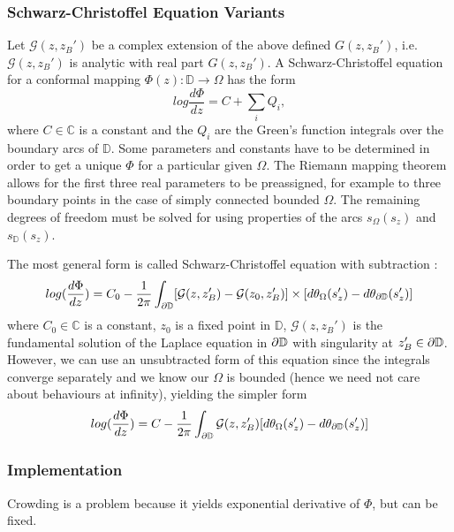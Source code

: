 \subsubsection{Schwarz-Christoffel Equation Variants}
Let $\mathcal{G}(z, z_B')$ be a complex extension of the above defined $G(z,z_B')$, i.e. $\mathcal{G}(z, z_B')$ is analytic with real part $G(z,z_B')$.
A Schwarz-Christoffel equation for a conformal mapping $\Phi(z):\mathbb{D}\to\Omega$ has the form $$ log \frac{d\Phi}{dz}= C+\displaystyle\sum_i Q_i,$$ where $C\in\mathbb{C}$ is a constant and the $Q_i$ are the Green's function integrals over the boundary arcs of $\mathbb{D}$.
Some parameters and constants have to be determined in order to get a unique $\Phi$ for a particular given $\Omega$. The Riemann mapping theorem allows  for the first three real parameters to be preassigned, for example to three boundary points in the case of simply connected bounded $\Omega$. The remaining degrees of freedom must be solved for using properties of the arcs $s_{\Omega}(s_z)$ and $s_{\mathbb{D}}(s_z)$. 

The most general form is called Schwarz-Christoffel equation with subtraction \cite{FLORYAN1987_SC_general}:
$$log(\frac{d\Phi}{dz}) = C_0 - \frac{1}{2\pi}\displaystyle\int_{\partial\mathbb {D}} [\mathcal{G}(z, z_B')-\mathcal{G}(z_0, z_B')] \times [d\theta_{\Omega}(s_z')-d\theta_{\partial\mathbb{D}}(s_z')]$$
where $C_0\in\mathbb{C}$ is a constant, $z_0$ is a fixed point in $\mathbb{D}$, $\mathcal{G}(z,z_B')$ is the fundamental solution of the Laplace equation in $\partial\mathbb{D}$ with singularity at $z_B' \in \partial\mathbb{D}$. However, we can use an unsubtracted form of this equation since the integrals converge separately and we know our $\Omega$ is bounded (hence we need not care about behaviours at infinity), yielding the simpler form
$$log(\frac{d\Phi}{dz}) = C - \frac{1}{2\pi}\int_{\partial\mathbb{D}} \mathcal{G}(z, z_B') [d\theta_{\Omega}(s_z')-d\theta_{\partial\mathbb{D}}(s_z')]$$


\subsubsection{Implementation}
\cite{Brown1990_SC_meshgen}
\cite{Trefethen1980_SCnumericalcomputation}
\cite{banjaitrefethen2006_SCmultipolemethod}
\cite{Bezrodnykh2022_lauricella}
Crowding is a problem because it yields exponential derivative of $\Phi$, but can be fixed. \cite{Banjai2008_SC_crowdingworkaround}
\fi

